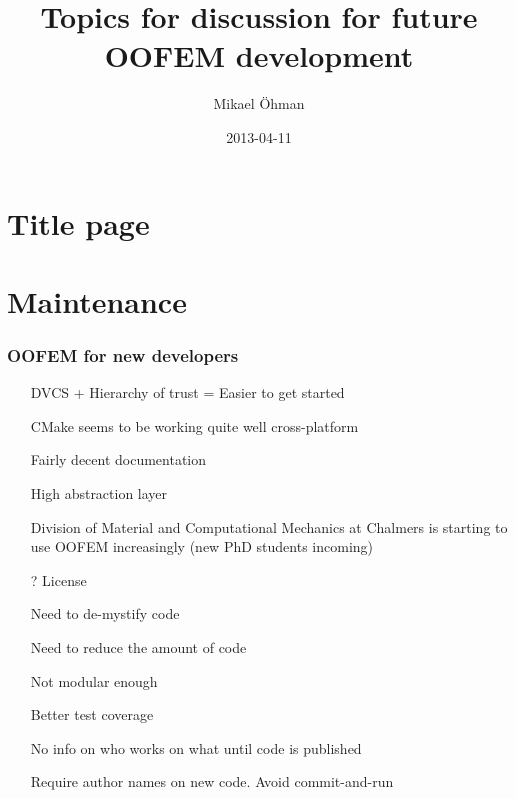 \documentclass[11pt]{beamer} %
\title{Topics for discussion for future OOFEM development}
\author[Mikael \"Ohman]{Mikael \"Ohman}
\institute{Department of Applied Mechanics\\ Chalmers University of Technology}
\date{2013-04-11}
\begin{document}
\section{Title page}
\begin{frame}[plain]
 \titlepage
\end{frame}

\section{Maintenance}
\begin{frame}
 \frametitle{OOFEM for new developers}
\begin{itemize}
 \item[\smiley] DVCS + Hierarchy of trust = Easier to get started
 \item[\smiley] CMake seems to be working quite well cross-platform
 \item[\smiley] Fairly decent documentation
 \item[\smiley] High abstraction layer
 \item[\smiley] Division of Material and Computational Mechanics at Chalmers is starting to use OOFEM increasingly (new PhD students incoming)
 \item[?] License
\end{itemize}
\begin{itemize}
 \item[\frownie] Need to de-mystify code
 \item[\frownie] Need to reduce the amount of code
 \item[\frownie] Not modular enough
 \item[\frownie] Better test coverage
 \item[\frownie] No info on who works on what until code is published
 \item[\frownie] Require author names on new code. Avoid commit-and-run
\end{itemize}
\end{frame}
\end{document}
